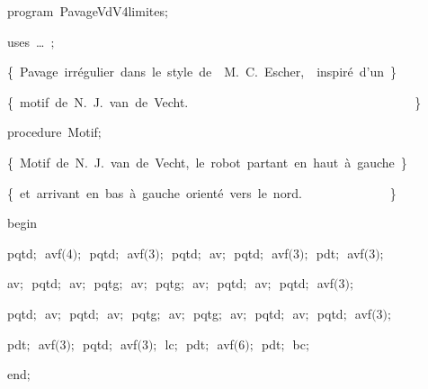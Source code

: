 
{
\parindent {}
\medskip

\carrenoir
\vspace{\neglskip}\mbox{\blc  \idt  \mcl program\idt \ PavageVdV4limites$;$
}\par 
\vspace{\neglskip}\mbox{\blc \blk\idt \mcl uses\idt \ \ldots\ $;$
}\par 
\medskip

\vspace{\neglskip}\mbox{\blc  \blk\idt  \cmt  \{\ Pavage\ irrégulier\ dans\ le\ style\ de\ \ M.\ C.\ Escher,\ \ inspiré\ d{'}un\ \}\idt }\par 
\vspace{\neglskip}\mbox{\blc  \blk\idt  \cmt  \{\ motif\ de\ N.\ J.\ van\ de\ Vecht.\ \ \ \ \ \ \ \ \ \ \ \ \ \ \ \ \ \ \ \ \ \ \ \ \ \ \ \ \ \ \ \ \ \ \ \ \}\idt }\par 
\medskip

\pagebreak[3] 
\vspace{\neglskip}\mbox{\blc  \blk\idt  \mcl procedure\idt \ Motif$;$}\par 
\vspace{\neglskip}\mbox{\blc  \blk\blk\idt  \cmt  \{\ Motif\ de\ N.\ J.\ van\ de\ Vecht,\ le\ robot\ partant\ en\ haut\ à\ gauche\ \}\idt }\par 
\vspace{\neglskip}\mbox{\blc  \blk\blk\idt  \cmt  \{\ et\ arrivant\ en\ bas\ à\ gauche\ orienté\ vers\ le\ nord.\ \ \ \ \ \ \ \ \ \ \ \ \ \ \}\idt }\par 
\vspace{\neglskip}\mbox{\blc  \blk\idt  \mcl begin\idt }\par 
\vspace{\neglskip}\mbox{\blc  \blk\blk\idt  pqtd$;$\ avf$($4$)$$;$\ pqtd$;$\ avf$($3$)$$;$\ pqtd$;$\ av$;$\ pqtd$;$\ avf$($3$)$$;$\ pdt$;$\ avf$($3$)$$;$}\par 
\vspace{\neglskip}\mbox{\blc  \blk\blk\idt  av$;$\ pqtd$;$\ av$;$\ pqtg$;$\ av$;$\ pqtg$;$\ av$;$\ pqtd$;$\ av$;$\ pqtd$;$\ avf$($3$)$$;$\ }\par 
\vspace{\neglskip}\mbox{\blc  \blk\blk\idt  pqtd$;$\ av$;$\ pqtd$;$\ av$;$\ pqtg$;$\ av$;$\ pqtg$;$\ av$;$\ pqtd$;$\ av$;$\ pqtd$;$\ avf$($3$)$$;$\ }\par 
\vspace{\neglskip}\mbox{\blc  \blk\blk\idt  pdt$;$\ avf$($3$)$$;$\ pqtd$;$\ avf$($3$)$$;$\ lc$;$\ pdt$;$\ avf$($6$)$$;$\ pdt$;$\ bc$;$\ }\par 
\vspace{\neglskip}\mbox{\blc  \blk\idt  \mcl end\idt $;$}\par 
\medskip

}
